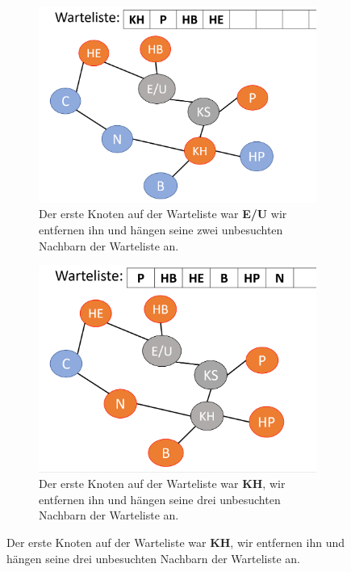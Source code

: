 \begin{figure}[H]
\begin{subfigure}[h]{0.45\textwidth}
    \label{fig:BS2}
    \end{subfigure}
    \vspace{5mm}
    \begin{subfigure}[h]{0.45\textwidth}
    \raggedright
    \includegraphics[width=\textwidth]{Pictures/BS/BFSB2.PNG}
    \caption{ Der erste Knoten auf der Warteliste war {\bf{E/U}} wir entfernen ihn und hängen seine zwei unbesuchten Nachbarn der Warteliste an.}
    \end{subfigure}
    \vspace{5mm}
    \qquad
    \begin{subfigure}[h]{0.45\textwidth}
    \raggedleft
    \includegraphics[width=\textwidth]{Pictures/BS/BFSB3.PNG}
    \caption{Der erste Knoten auf der Warteliste war {\bf{KH}}, wir entfernen ihn und hängen seine drei unbesuchten Nachbarn der Warteliste an.} 
    \end{subfigure}
    \end{figure}
